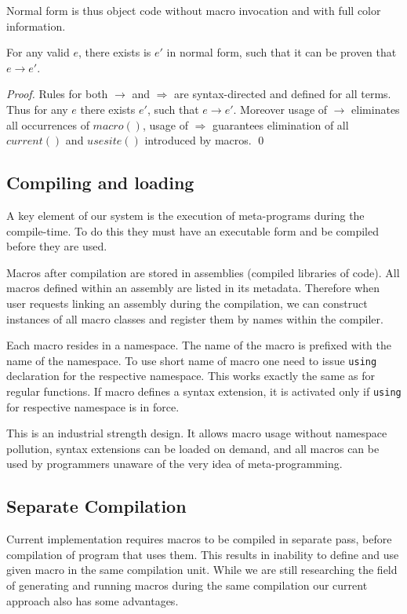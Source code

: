 \documentclass{llncs}
\begin{document}
Normal form is thus object code without macro invocation and with full
color information.

\begin{theorem}
For any valid $e$, there exists is $e'$ in normal form,
such that it can be proven that $e \rightarrow e'$.
\end{theorem}

\begin{proof}
Rules for both $\rightarrow$ and $\Rightarrow$ are
syntax-directed and defined for all terms. Thus for any $e$ there exists
$e'$, such that $e \rightarrow e'$. Moreover usage of $\rightarrow$
eliminates all occurrences of $macro()$, usage of $\Rightarrow$ guarantees
elimination of all $current()$ and $usesite()$ introduced by macros.
\qed
\end{proof}

\subsection{Compiling and loading}
A key element of our system is the execution of meta-programs during 
the compile-time. To do this they must have an executable form and be
compiled before they are used.

Macros after compilation are stored in assemblies (compiled libraries
of code). All macros defined within an assembly are listed in its metadata.
Therefore when user requests linking an assembly during the compilation,
we can construct instances of all macro classes and register them by
names within the compiler.

Each macro resides in a namespace. The name of the macro is prefixed
with the name of the namespace. To use short name of macro one need
to issue \verb,using, declaration for the respective namespace. This
works exactly the same as for regular functions. If macro defines a
syntax extension, it is activated only if \verb,using, for respective
namespace is in force.

This is an industrial strength design. It allows macro usage without namespace
pollution, syntax extensions can be loaded on demand, and all macros
can be used by programmers unaware of the very idea of meta-programming.

\subsection{Separate Compilation}
Current implementation requires macros to be compiled in separate pass,
before compilation of program that uses them. This results in inability
to define and use given macro in the same compilation unit. While we
are still researching the field of generating and running macros during
the same compilation our current approach also has some advantages.
\end{document}
